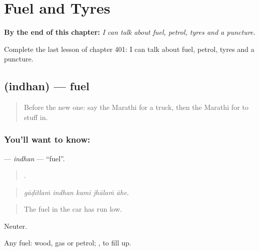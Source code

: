 
\chapter{Fuel and Tyres}
\label{ch:mr-fuel-and-tyres}

\begin{chapteropening}
\textbf{By the end of this chapter:} \emph{I can talk about fuel, petrol, tyres and a puncture.}

Complete the last lesson of chapter 401: I can talk about fuel, petrol, tyres and a puncture.
\end{chapteropening}

\section[\texorpdfstring{\mr{इंधन} (indhan)}{इंधन (indhan)}]{ (indhan) — fuel}

\label{lesson:MR-C401-indhan}



\begin{quote}
Before the new one: say the Marathi for a truck, then the Marathi for to stuff in.
\end{quote}

\subsection*{You'll want to know: }
\textbf{} — \emph{indhan} — \textquotedblleft{}fuel\textquotedblright{}.

\begin{quote}
    .
\end{quote}

\begin{quote}
\emph{gāḍītlaṁ indhan kamī jhālaṁ āhe.}
\end{quote}

\begin{quote}
The fuel in the car has run low.
\end{quote}

Neuter.

Any fuel: wood, gas or petrol;  , to fill up.

